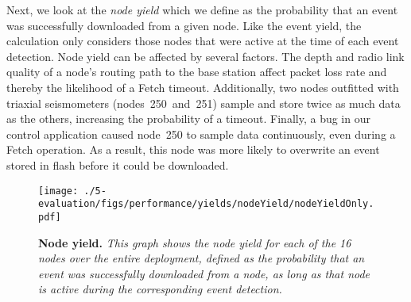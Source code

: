

Next, we look at the {\em node yield} which we define as the
probability that an event was successfully downloaded from a given
node.  Like the event yield, the calculation only considers those
nodes that were active at the time of each event detection.  Node yield
can be affected by several factors.  The depth and radio link quality
of a node's routing path to the base station affect packet loss rate
and thereby the likelihood of a Fetch timeout.
Additionally, two nodes outfitted with triaxial seismometers
(nodes~250~and~251) sample and store twice as much data as the others,
increasing the probability of a timeout.  Finally, a bug in our control
application caused node~250 to sample data continuously, even during a Fetch
operation. As a result, this node was more likely to overwrite an 
event stored in flash before it could be downloaded.

\begin{figure}[t]
\begin{center}
\texttt{[image: ./5-evaluation/figs/performance/yields/nodeYield/nodeYieldOnly.pdf]}
\end{center}
\caption{\small{\bf Node yield.}
{\em This graph shows the node yield for each of the 16 nodes
over the entire deployment, defined as the probability that an event
was successfully downloaded from a node, as long as that node is active 
during the corresponding event detection.}}
\label{fig-nodeYield}
\end{figure}

